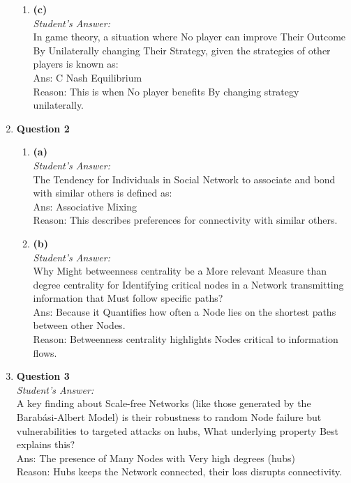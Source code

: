 \documentclass[a4paper,12pt]{article}
\begin{document}
\begin{enumerate}
\begin{enumerate}
        \item \textbf{(c)} \\
        \textit{Student's Answer:} \\
        In game theory, a situation where No player can improve Their Outcome By Unilaterally changing Their Strategy, given the strategies of other players is known as: \\
        Ans: C Nash Equilibrium \\
        Reason: This is when No player benefits By changing strategy unilaterally.
    \end{enumerate}

    \item \textbf{Question 2}
    \begin{enumerate}
        \item \textbf{(a)} \\
        \textit{Student's Answer:} \\
        The Tendency for Individuals in Social Network to associate and bond with similar others is defined as: \\
        Ans: Associative Mixing \\
        Reason: This describes preferences for connectivity with similar others.

        \item \textbf{(b)} \\
        \textit{Student's Answer:} \\
        Why Might betweenness centrality be a More relevant Measure than degree centrality for Identifying critical nodes in a Network transmitting information that Must follow specific paths? \\
        Ans: Because it Quantifies how often a Node lies on the shortest paths between other Nodes. \\
        Reason: Betweenness centrality highlights Nodes critical to information flows.
    \end{enumerate}

    \item \textbf{Question 3} \\
    \textit{Student's Answer:} \\
    A key finding about Scale-free Networks (like those generated by the Barabási-Albert Model) is their robustness to random Node failure but vulnerabilities to targeted attacks on hubs, What underlying property Best explains this? \\
    Ans: The presence of Many Nodes with Very high degrees (hubs) \\
    Reason: Hubs keeps the Network connected, their loss disrupts connectivity.


\end{enumerate}
\end{document}
